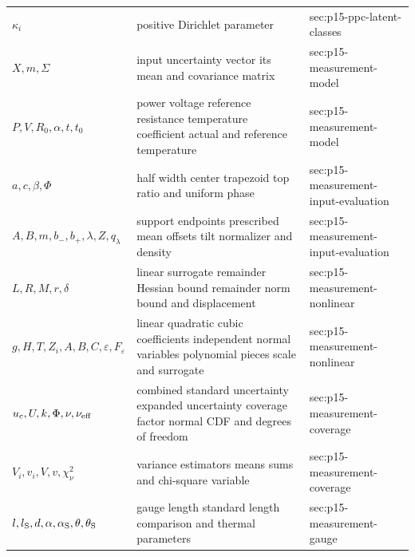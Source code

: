 \begin{longtable}{@{}p{}p{}p{}@{}}
\(\kappa_i\) & positive Dirichlet parameter & sec:\allowbreak{}p15-\allowbreak{}ppc-\allowbreak{}latent-\allowbreak{}classes \\
\(X,\allowbreak m,\allowbreak \Sigma\) & input uncertainty vector its mean and covariance matrix & sec:\allowbreak{}p15-\allowbreak{}measurement-\allowbreak{}model \\
\(P,\allowbreak V,\allowbreak R_0,\allowbreak \alpha,\allowbreak t,\allowbreak t_0\) & power voltage reference resistance temperature coefficient actual and reference temperature & sec:\allowbreak{}p15-\allowbreak{}measurement-\allowbreak{}model \\
\(a,\allowbreak c,\allowbreak \beta,\allowbreak \Phi\) & half width center trapezoid top ratio and uniform phase & sec:\allowbreak{}p15-\allowbreak{}measurement-\allowbreak{}input-\allowbreak{}evaluation \\
\(A,\allowbreak B,\allowbreak m,\allowbreak b_-,\allowbreak b_+,\allowbreak \lambda,\allowbreak Z,\allowbreak q_\lambda\) & support endpoints prescribed mean offsets tilt normalizer and density & sec:\allowbreak{}p15-\allowbreak{}measurement-\allowbreak{}input-\allowbreak{}evaluation \\
\(L,\allowbreak R,\allowbreak M,\allowbreak r,\allowbreak \delta\) & linear surrogate remainder Hessian bound remainder norm bound and displacement & sec:\allowbreak{}p15-\allowbreak{}measurement-\allowbreak{}nonlinear \\
\(g,\allowbreak H,\allowbreak T,\allowbreak Z_i,\allowbreak A,\allowbreak B,\allowbreak C,\allowbreak \varepsilon,\allowbreak F_\varepsilon\) & linear quadratic cubic coefficients independent normal variables polynomial pieces scale and surrogate & sec:\allowbreak{}p15-\allowbreak{}measurement-\allowbreak{}nonlinear \\
\(u_c,\allowbreak U,\allowbreak k,\allowbreak \Phi,\allowbreak \nu,\allowbreak \nu_{\rm eff}\) & combined standard uncertainty expanded uncertainty coverage factor normal CDF and degrees of freedom & sec:\allowbreak{}p15-\allowbreak{}measurement-\allowbreak{}coverage \\
\(V_i,\allowbreak v_i,\allowbreak V,\allowbreak v,\allowbreak \chi_\nu^2\) & variance estimators means sums and chi-square variable & sec:\allowbreak{}p15-\allowbreak{}measurement-\allowbreak{}coverage \\
\(l,\allowbreak l_{\rm S},\allowbreak d,\allowbreak \alpha,\allowbreak \alpha_{\rm S},\allowbreak \theta,\allowbreak \theta_{\rm S}\) & gauge length standard length comparison and thermal parameters & sec:\allowbreak{}p15-\allowbreak{}measurement-\allowbreak{}gauge \\

\end{longtable}
